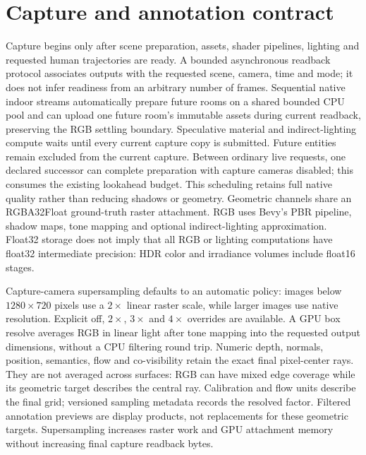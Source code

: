 \documentclass{article}
\begin{document}
\section{Capture and annotation contract}
Capture begins only after scene preparation, assets, shader pipelines, lighting and requested human trajectories are ready. A bounded asynchronous readback protocol associates outputs with the requested scene, camera, time and mode; it does not infer readiness from an arbitrary number of frames. Sequential native indoor streams automatically prepare future rooms on a shared bounded CPU pool and can upload one future room's immutable assets during current readback, preserving the RGB settling boundary. Speculative material and indirect-lighting compute waits until every current capture copy is submitted. Future entities remain excluded from the current capture. Between ordinary live requests, one declared successor can complete preparation with capture cameras disabled; this consumes the existing lookahead budget. This scheduling retains full native quality rather than reducing shadows or geometry. Geometric channels share an RGBA32Float ground-truth raster attachment. RGB uses Bevy's PBR pipeline, shadow maps, tone mapping and optional indirect-lighting approximation. Float32 storage does not imply that all RGB or lighting computations have float32 intermediate precision: HDR color and irradiance volumes include float16 stages.

Capture-camera supersampling defaults to an automatic policy: images below
$1280\times720$ pixels use a $2\times$ linear raster scale, while larger images
use native resolution. Explicit off, $2\times$, $3\times$ and $4\times$ overrides
are available. A GPU box resolve averages RGB in linear light after tone mapping
into the requested output dimensions, without a CPU filtering round trip.
Numeric depth, normals, position, semantics, flow and co-visibility retain the
exact final pixel-center rays. They are not averaged across surfaces: RGB can
have mixed edge coverage while its geometric target describes the central ray.
Calibration and flow units describe the final grid; versioned sampling metadata
records the resolved factor. Filtered annotation previews are display products,
not replacements for these geometric targets. Supersampling increases raster
work and GPU attachment memory without increasing final capture readback bytes.
\end{document}
